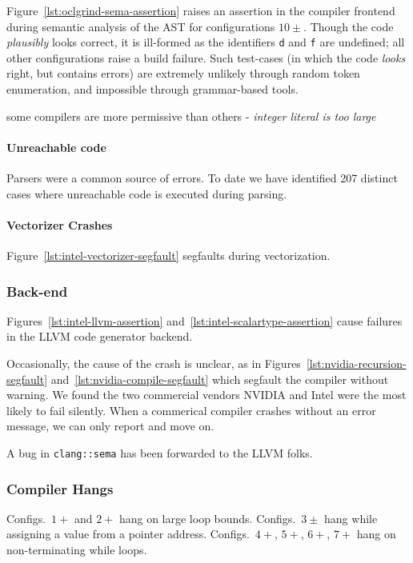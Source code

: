 Figure~\ref{lst:oclgrind-sema-assertion} raises an assertion in the compiler frontend during semantic analysis of the AST for configurations $10\pm$. Though the code \emph{plausibly} looks correct, it is ill-formed as the identifiers \texttt{d} and \texttt{f} are undefined; all other configurations raise a build failure. Such test-cases (in which the code \emph{looks} right, but contains errors) are extremely unlikely through random token enumeration, and impossible through grammar-based tools.

some compilers are more permissive than others - \emph{integer literal is too large}

\paragraph{Unreachable code} Parsers were a common source of errors. To date we have identified 207 distinct cases where unreachable code is executed during parsing.

\paragraph{Vectorizer Crashes} Figure~\ref{lst:intel-vectorizer-segfault} segfaults during vectorization.

\subsubsection{Back-end} Figures~\ref{lst:intel-llvm-assertion} and~\ref{lst:intel-scalartype-assertion} cause failures in the LLVM code generator backend.

Occasionally, the cause of the crash is unclear, as in Figures~\ref{lst:nvidia-recursion-segfault} and~\ref{lst:nvidia-compile-segfault} which segfault the compiler without warning. We found the two commercial vendors NVIDIA and Intel were the most likely to fail silently. When a commerical compiler crashes without an error message, we can only report and move on.

A bug in \texttt{clang::sema} has been forwarded to the LLVM folks.



\subsubsection{Compiler Hangs}
Configs.\ $1+$ and $2+$ hang on large loop bounds. Configs.\ $3\pm$ hang while assigning a value from a pointer address. Configs.\ $4+$, $5+$, $6+$, $7+$ hang on non-terminating while loops.

